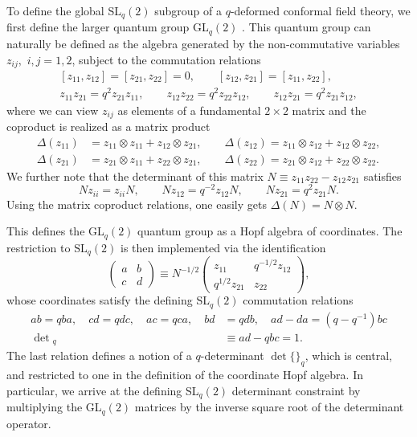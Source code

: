 \documentclass[a4paper,titlepage,12pt]{article}
\numberwithin{equation}{section}
\begin{document}
To define the global SL$_q(2)$ subgroup of a $q$-deformed conformal field theory, we first define the larger quantum group GL$_q(2)$ \cite{Ip:2013}. This quantum group can naturally be defined as the algebra generated by the non-commutative variables $z_{ij},\,\, i,j = 1,2$, subject to the commutation relations
\begin{gather}
\left[ z_{11},  z_{12} \right] = \left[ z_{21},  z_{22} \right] = 0, \qquad  
\left[ z_{12},  z_{21} \right]  = \left[ z_{11},  z_{22} \right], \\
z_{11}z_{21} = q^2 z_{21} z_{11},  \qquad z_{12}z_{22} = q^2 z_{22}z_{12}, \qquad 
z_{12}z_{21} = q^2 z_{21} z_{12},
\end{gather}
where we can view $z_{ij}$ as elements of a fundamental $2 \times 2$ matrix and the coproduct is realized as a matrix product 
\begin{align}
    \Delta(z_{11})&=z_{11}\otimes z_{11}+z_{12}\otimes z_{21}, \qquad \Delta(z_{12})=z_{11}\otimes z_{12}+z_{12}\otimes z_{22},\\ \Delta(z_{21})&=z_{21}\otimes z_{11}+z_{22}\otimes z_{21},\qquad \Delta(z_{22})=z_{21}\otimes z_{12}+z_{22}\otimes z_{22}. 
\end{align} 
We further note that the determinant of this matrix $N \equiv z_{11}z_{22} - z_{12} z_{21}$ satisfies 
\begin{equation}
    Nz_{ii} = z_{ii}N, \qquad N  z_{12} = q^{-2} z_{12} N, \qquad N z_{21} = q^{2} z_{21}  N.
    \label{eq:commN}
\end{equation} 
Using the matrix coproduct relations, one easily gets $\Delta(N)=N\otimes N$.

This defines the GL$_q(2)$ quantum group as a Hopf algebra of coordinates. The restriction to $\text{SL}_q(2)$ is then implemented via the identification \cite{Ip:2013}
\begin{equation}
\label{eq:projection}
    \begin{pmatrix}
        a & b \\ c & d
    \end{pmatrix} \equiv  N^{-1/2}\begin{pmatrix}
z_{11} & q^{-1/2}z_{12} \\q^{1/2} z_{21} & z_{22}        
    \end{pmatrix},
\end{equation}
whose coordinates satisfy the defining SL$_q(2)$ commutation relations 
\begin{align}
\label{eq:coordinatealgebra}
   ab = qba, \quad cd = qdc, \quad ac = qca, \quad bd &= qdb, \quad ad - da = (q - q^{-1})bc \\
    \det{}_q &\equiv ad - qbc = 1.
\end{align}
The last relation defines a notion of a $q$-determinant $\det\{\}_q$, which is central, and restricted to one in the definition of the coordinate Hopf algebra. In particular, we arrive at the defining SL$_q(2)$ determinant constraint by multiplying the GL$_q(2)$ matrices by the inverse square root of the determinant operator.
\end{document}
